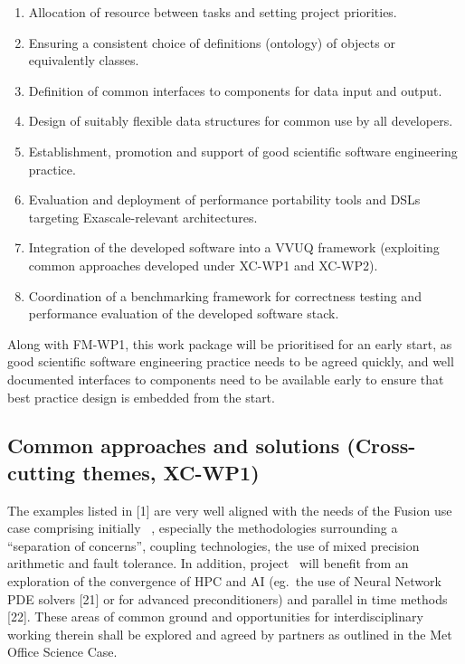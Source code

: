\begin{enumerate}
\item Allocation of resource between tasks and setting project priorities.

\item Ensuring a consistent choice of definitions (ontology) of objects or equivalently 
classes.

\item Definition of common interfaces to components for data input and output. 

\item Design of suitably flexible data structures for common use by all developers.

\item Establishment, promotion and support of good scientific software engineering 
practice.

\item Evaluation and deployment of performance portability tools and DSLs targeting 
Exascale-relevant architectures.

\item Integration of the developed software into a VVUQ framework (exploiting common 
approaches developed under XC-WP1 and XC-WP2).

\item Coordination of a benchmarking framework for correctness testing and performance 
evaluation of the developed software stack.
\end{enumerate}

Along with FM-WP1, this work package will be prioritised for an early start, as 
good scientific software engineering practice needs to be agreed quickly, and well 
documented interfaces to components need to be available early to ensure that best 
practice design is embedded from the start.


\subsection*{\textbf{Common approaches and solutions} (Cross-cutting themes,  \textbf{XC-WP1})}

The examples listed in [1] are very well aligned with the needs 
of the Fusion use case comprising initially \nep \  , especially the methodologies 
surrounding a ``separation of concerns'', coupling technologies, the use of mixed 
precision arithmetic and fault tolerance. In addition, project \nep \   will benefit 
from an exploration of the convergence of HPC and AI (eg.\ the use of Neural Network 
PDE solvers [21] or for advanced preconditioners) and parallel in time methods 
[22]. These areas of common ground and opportunities for interdisciplinary working 
therein shall be explored and agreed by partners as outlined in the Met Office 
Science Case.

